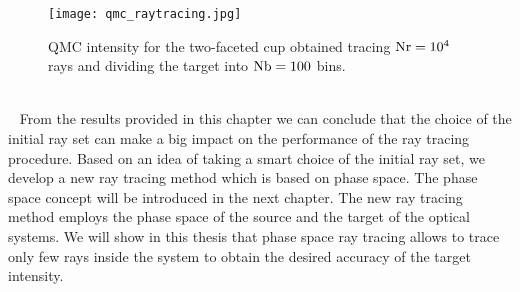 \begin{figure}[h]\vspace{-3cm}
\begin{center}
    \texttt{[image: qmc\_raytracing.jpg]}
    \caption{QMC intensity for the two-faceted cup obtained tracing $\textrm{Nr}=10^4$ rays and dividing the target into $\textrm{Nb}=100$ bins.}
    \label{fig:qmc_intensity}
\end{center}
  \end{figure}
 \\\ \indent
From the results provided in this chapter we can conclude that the choice of the initial ray set can make a big impact on the performance of the ray tracing procedure. 
Based on an idea of taking a smart choice of the initial ray set, we develop a new ray tracing method which is based on phase space. 
The phase space concept will be introduced in the next chapter. The new ray tracing method employs the phase space of the source and the target of the optical systems.
We will show in this thesis that phase space ray tracing allows to trace only few rays inside the system to obtain the desired accuracy of the target intensity. 





















